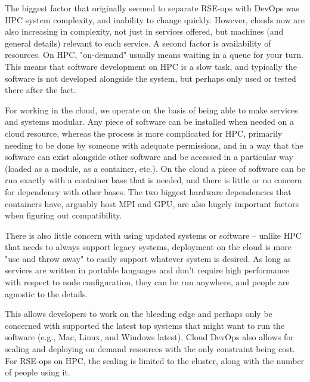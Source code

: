The biggest factor that originally seemed to separate RSE-ops with DevOps was HPC system complexity, and inability to change quickly. However, clouds now are also increasing in complexity, not just in services offered, but machines (and general details) relevant to each service. A second factor is availability of resources. On HPC, "on-demand" usually means waiting in a queue for your turn. This means that software development on HPC is a slow task, and typically the software is not developed alongside the system, but perhaps only used or tested there after the fact.

For working in the cloud, we operate on the basis of being able to make services and systems modular. Any piece of software can be installed when needed on a cloud resource, whereas the process is more complicated for HPC, primarily needing to be done by someone with adequate permissions, and in a way that the software can exist alongside other software and be accessed in a particular way (loaded as a module, as a container, etc.). On the cloud a piece of software can be run exactly with a container base that is needed, and there is little or no concern for dependency with other bases. The two biggest hardware dependencies that containers have, arguably host MPI and GPU, are also hugely important factors when figuring out compatibility.

There is also little concern with using updated systems or software -- unlike HPC that needs to always support legacy systems, deployment on the cloud is more "use and throw away" to easily support whatever system is desired. As long as services are written in portable languages and don't require high performance with respect to node configuration, they can be run anywhere, and people are agnostic to the details.

This allows developers to work on the bleeding edge and perhaps only be concerned with supported the latest top systems that might  want to run the software (e.g., Mac, Linux, and Windows latest). Cloud DevOps also allows for scaling and deploying on demand resources with the only constraint being cost. For RSE-ops on HPC, the scaling is limited to the cluster, along with the number of people using it.

